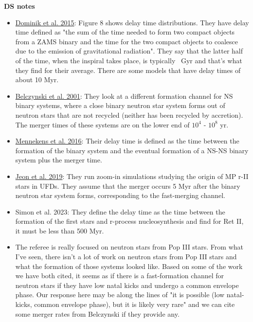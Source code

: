 \documentclass[11pt]{article}
\begin{document}
\noindent\textbf{DS notes}
\begin{itemize}
  \item \href{https://iopscience.iop.org/article/10.1088/0004-637X/759/1/52/pdf}{Dominik et al. 2015}: Figure 8 shows delay time distributions. They have delay time defined as "the sum of the time needed to form two compact objects from a ZAMS binary and the time for the two compact objects to coalesce due to the emission of gravitational radiation". They say that the latter half of the time, when the inspiral takes place, is typically ~Gyr and that's what they find for their average. There are some models that have delay times of about 10 Myr.
  \item \href{https://iopscience.iop.org/article/10.1086/319641/pdf}{Belczynski et al. 2001}: They look at a different formation channel for NS binary systems, where a close binary neutron star system forms out of neutron stars that are not recycled (neither has been recycled by accretion). The merger times of these systems are on the lower end of $10^4$ - $10^8$ yr.
  \item \href{https://www.aanda.org/articles/aa/pdf/2016/05/aa28193-16.pdf}{Mennekens et al. 2016}: Their delay time is defined as the time between the formation of the binary system and the eventual formation of a NS-NS binary system plus the merger time.
  \item \href{https://arxiv.org/pdf/2106.13383.pdf}{Jeon et al. 2019}: They run zoom-in simulations studying the origin of MP r-II stars in UFDs. They assume that the merger occurs 5 Myr after the binary neutron star system forms, corresponding to the fast-merging channel.
  \item Simon et al. 2023: They define the delay time as the time between the formation of the first stars and r-process nucleosynthesis and find for Ret II, it must be less than 500 Myr.
  \item The referee is really focused on neutron stars from Pop III stars. From what I've seen, there isn't a lot of work on neutron stars from Pop III stars and what the formation of those systems looked like. Based on some of the work we have both cited, it seems as if there is a fast-formation channel for neutron stars if they have low natal kicks and undergo a common envelope phase. Our response here may be along the lines of "it is possible (low natal-kicks, common envelope phase), but it is likely very rare" and we can cite some merger rates from Belczynski if they provide any. 
\end{itemize}
\end{document}
